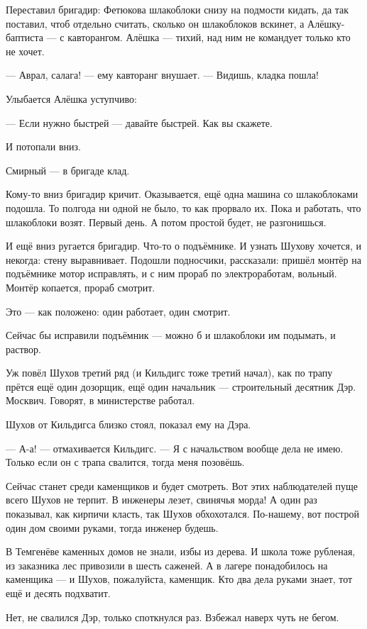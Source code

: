 Переставил бригадир: Фетюкова шлакоблоки снизу на подмости кидать, да так поставил, чтоб
отдельно считать, сколько он шлакоблоков вскинет, а Алёшку-баптиста --- с кавторангом. Алёшка
--- тихий, над ним не командует только кто не хочет.

--- Аврал, салага! --- ему кавторанг внушает. --- Видишь, кладка пошла!

Улыбается Алёшка уступчиво:

--- Если нужно быстрей --- давайте быстрей. Как вы скажете.

И потопали вниз.

Смирный --- в бригаде клад.

Кому-то вниз бригадир кричит. Оказывается, ещё одна машина со шлакоблоками подошла. То
полгода ни одной не было, то как прорвало их. Пока и работать, что шлакоблоки возят. Первый
день. А потом простой будет, не разгонишься.

И ещё вниз ругается бригадир. Что-то о подъёмнике. И узнать Шухову хочется, и некогда: стену
выравнивает. Подошли подносчики, рассказали: пришёл монтёр на подъёмнике мотор исправлять,
и с ним прораб по электроработам, вольный. Монтёр копается, прораб смотрит.

Это --- как положено: один работает, один смотрит.

Сейчас бы исправили подъёмник --- можно б и шлакоблоки им подымать, и раствор.

Уж повёл Шухов третий ряд (и Кильдигс тоже третий начал), как по трапу прётся ещё один
дозорщик, ещё один начальник --- строительный десятник Дэр. Москвич. Говорят, в министерстве
работал.

Шухов от Кильдигса близко стоял, показал ему на Дэра.

--- А-а! --- отмахивается Кильдигс. --- Я с начальством вообще дела не имею. Только если он с трапа
свалится, тогда меня позовёшь.

Сейчас станет среди каменщиков и будет смотреть. Вот этих наблюдателей пуще всего Шухов не
терпит. В инженеры лезет, свинячья морда! А один раз показывал, как кирпичи класть, так Шухов
обхохотался. По-нашему, вот построй один дом своими руками, тогда инженер будешь.

В Темгенёве каменных домов не знали, избы из дерева. И школа тоже рубленая, из заказника лес
привозили в шесть саженей. А в лагере понадобилось на каменщика --- и Шухов, пожалуйста,
каменщик. Кто два дела руками знает, тот ещё и десять подхватит.

Нет, не свалился Дэр, только споткнулся раз. Взбежал наверх чуть не бегом.

